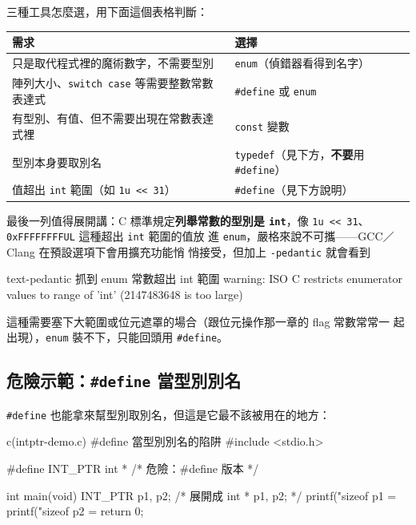 三種工具怎麼選，用下面這個表格判斷：

\begin{center}
\begin{tabular}{ll}
\toprule
需求 & 選擇 \\
\midrule
只是取代程式裡的魔術數字，不需要型別 & \texttt{enum}（偵錯器看得到名字） \\
陣列大小、\texttt{switch case} 等需要整數常數表達式 & \texttt{\#define} 或 \texttt{enum} \\
有型別、有值、但不需要出現在常數表達式裡 & \texttt{const} 變數 \\
型別本身要取別名 & \texttt{typedef}（見下方，\textbf{不要}用 \texttt{\#define}）\\
值超出 \texttt{int} 範圍（如 \texttt{1u << 31}） & \texttt{\#define}（見下方說明）\\
\bottomrule
\end{tabular}
\end{center}

最後一列值得展開講：C 標準規定\textbf{列舉常數的型別是 \texttt{int}}，像
\texttt{1u << 31}、\texttt{0xFFFFFFFFUL} 這種超出 \texttt{int} 範圍的值放
進 \texttt{enum}，嚴格來說不可攜——GCC／Clang 在預設選項下會用擴充功能悄
悄接受，但加上 \texttt{-pedantic} 就會看到

\begin{code}{text}{-pedantic 抓到 enum 常數超出 int 範圍}
warning: ISO C restricts enumerator values to range of 'int'
    (2147483648 is too large)
\end{code}

這種需要塞下大範圍或位元遮罩的場合（跟位元操作那一章的 flag 常數常常一
起出現），\texttt{enum} 裝不下，只能回頭用 \texttt{\#define}。

\subsection{危險示範：\texttt{\#define} 當型別別名}

\texttt{\#define} 也能拿來幫型別取別名，但這是它最不該被用在的地方：

\begin{example}{c}{(intptr-demo.c) \#define 當型別別名的陷阱}
#include <stdio.h>

#define INT_PTR int * /* 危險：#define 版本 */

int main(void) {
    INT_PTR p1, p2; /* 展開成 int * p1, p2; */
    printf("sizeof p1 = %
    printf("sizeof p2 = %
    return 0;
}
\end{example}

